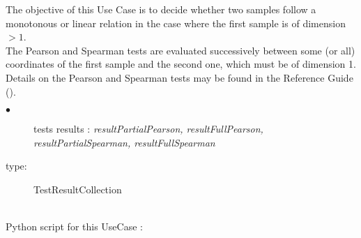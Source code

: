 \renewcommand{\filename}{docUC_InputWithData_PearsonSpearmanTests.tex}
\renewcommand{\filetitle}{UC : Particular manipulations of the Pearson and Spearman tests, when the first sample is of dimension superior to 1.}

\HeaderIIILevel



The objective of this Use Case is to decide whether two samples follow a monotonous or linear relation in the case where the first sample is of dimension $>1$.\\
The Pearson and Spearman tests are evaluated successively between some (or all) coordinates of the first sample and the second one, which must be of dimension 1.\\


Details on the Pearson and Spearman tests  may be found in the Reference Guide ().\\


             {
               \begin{description}
               \item[$\bullet$] tests results : {\itshape resultPartialPearson, resultFullPearson, resultPartialSpearman, resultFullSpearman}
               \item[type:] TestResultCollection
               \end{description}
             }

             \textspace\\
             Python script for this UseCase :

